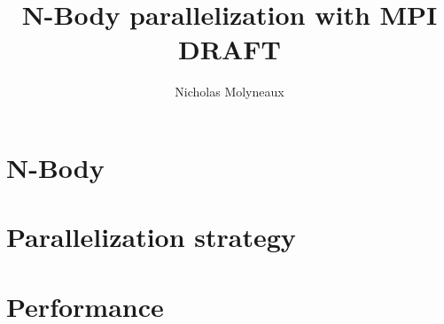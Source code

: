 \documentclass[a4paper,11pt]{article}
\begin{document}
\setlength{\parindent}{0pt}
\setlength{\parskip}{5pt plus 1pt minus 1pt}

\title{N-Body parallelization with MPI\\ DRAFT}
\author{Nicholas Molyneaux}
\vspace{-4cm}
\maketitle



\section{N-Body}

\section{Parallelization strategy}

\section{Performance}

\nocite{*}

\end{document}
